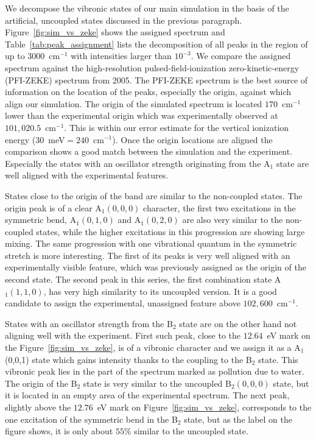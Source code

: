 \documentclass[12pt,prb,aps]{revtex4-2}
\begin{document}
We decompose the vibronic states of our main simulation in the basis of the
artificial, uncoupled states discussed in the previous paragraph.
Figure~\ref{fig:sim_vs_zeke} shows the assigned spectrum and
Table~\ref{tab:peak_assignment} lists the decomposition of all peaks in the
region of up to $3000$~cm$^{-1}$ with intensities larger than $10^{-3}$. We
compare the assigned spectrum against the high-resolution
pulsed-field-ionization zero-kinetic-energy (PFI-ZEKE) spectrum from
2005.\cite{Willitsch:O3ZEKE:2005} The PFI-ZEKE spectrum is the best source of
information on the location of the peaks, especially the origin, against which
align our simulation. The origin of the simulated spectrum is located
$170$~cm$^{-1}$ lower than the experimental origin which was experimentally
observed at $101,020.5$~cm$^{-1}$.\cite{Willitsch:O3ZEKE:2005} This is within
our error estimate for the vertical ionization energy
($30$~meV$=240$~cm$^{-1}$).  Once the origin locations are aligned the
comparison shows a good match between the simulation and the experiment.
Especially the states with an oscillator strength originating from the A$_1$
state are well aligned with the experimental features. 

States close to the origin of the band are similar to the non-coupled states.
The origin peak is of a clear A$_1(0,0,0)$ character, the first two
excitations in the symmetric bend, A$_1(0,1,0)$ and A$_1(0,2,0)$ are also very
similar to the non-coupled states, while the higher excitations in this
progression are showing large mixing. The same progression with one
vibrational quantum in the symmetric stretch is more interesting. The first of
its peaks is very well aligned with an experimentally visible feature, which
was previously assigned as the origin of the second state. The second peak in
this series, the first combination state A$_1(1,1,0)$, has very high
similarity to its uncoupled version. It is a good candidate to assign the
experimental, unassigned feature above $102,600$~cm$^{-1}$.

States with an oscillator strength from the B$_2$ state are on the other hand
not aligning well with the experiment. First such peak, close to the $12.64$~eV
mark on the Figure~\ref{fig:sim_vs_zeke}, is of a vibronic character and we
assign it as a A$_1$(0,0,1) state which gains intensity thanks to the coupling
to the B$_2$ state. This vibronic peak lies in the part of the spectrum marked
as pollution due to water. The origin of the B$_2$ state is very similar to
the uncoupled B$_2(0,0,0)$ state, but it is located in an empty area of the
experimental spectrum. The next peak, slightly above the $12.76$~eV mark on
Figure~\ref{fig:sim_vs_zeke}, corresponds to the one excitation of the symmetric
bend in the B$_2$ state, but as the label on the figure shows, it is only
about $55$\% similar to the uncoupled state.
\end{document}
